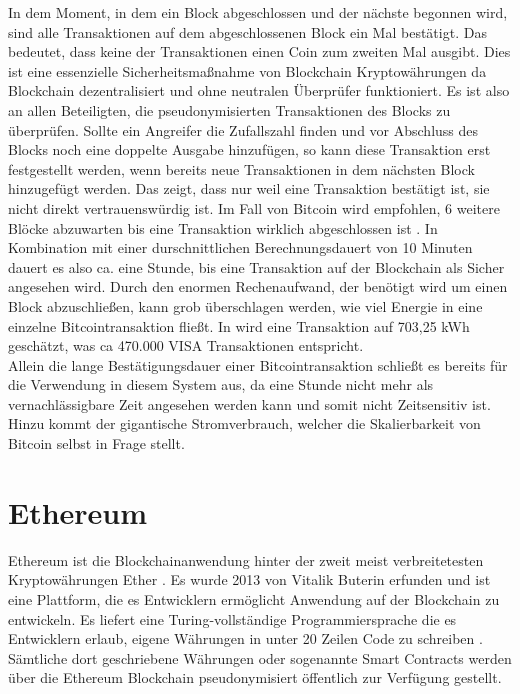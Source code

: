 \documentclass{scrreprt}
\begin{document}
In dem Moment, in dem ein Block abgeschlossen und der nächste begonnen wird, sind alle Transaktionen auf dem abgeschlossenen Block ein Mal bestätigt. Das bedeutet, dass keine der Transaktionen einen Coin zum zweiten Mal ausgibt. Dies ist eine essenzielle Sicherheitsmaßnahme von Blockchain Kryptowährungen da Blockchain dezentralisiert und ohne neutralen Überprüfer funktioniert. Es ist also an allen Beteiligten, die pseudonymisierten Transaktionen des Blocks zu überprüfen. Sollte ein Angreifer die Zufallszahl finden und vor Abschluss des Blocks noch eine doppelte Ausgabe hinzufügen, so kann diese Transaktion erst festgestellt werden, wenn bereits neue Transaktionen in dem nächsten Block hinzugefügt werden. Das zeigt, dass nur weil eine Transaktion bestätigt ist, sie nicht direkt vertrauenswürdig ist. Im Fall von Bitcoin wird empfohlen, 6 weitere Blöcke abzuwarten bis eine Transaktion wirklich abgeschlossen ist \cite{btc-Zaghloul2019Bitcoin}. In Kombination mit einer durschnittlichen Berechnungsdauert von 10 Minuten dauert es also ca. eine Stunde, bis eine Transaktion auf der Blockchain als Sicher angesehen wird.
Durch den enormen Rechenaufwand, der benötigt wird um einen Block abzuschließen, kann grob überschlagen werden, wie viel Energie in eine einzelne Bitcointransaktion fließt. In \cite{btc-energyConsumption} wird eine Transaktion auf 703,25 kWh geschätzt, was ca 470.000 VISA Transaktionen entspricht.\\

Allein die lange Bestätigungsdauer einer Bitcointransaktion schließt es bereits für die Verwendung in diesem System aus, da eine Stunde nicht mehr als vernachlässigbare Zeit angesehen werden kann und somit nicht Zeitsensitiv ist. Hinzu kommt der gigantische Stromverbrauch, welcher die Skalierbarkeit von Bitcoin selbst in Frage stellt. 


\section{Ethereum}
\label{sec:ethereum}
Ethereum ist die Blockchainanwendung hinter der zweit meist verbreitetesten Kryptowährungen Ether \cite{eth-marketCapitalisation}. Es wurde 2013 von Vitalik Buterin erfunden und ist eine Plattform, die es Entwicklern ermöglicht Anwendung auf der Blockchain zu entwickeln. Es liefert eine Turing-vollständige Programmiersprache die es Entwicklern erlaub, eigene Währungen in unter 20 Zeilen Code zu schreiben \cite{eth-buterin2013ethereum}. Sämtliche dort geschriebene Währungen oder sogenannte Smart Contracts werden über die Ethereum Blockchain pseudonymisiert öffentlich zur Verfügung gestellt. 
\end{document}
